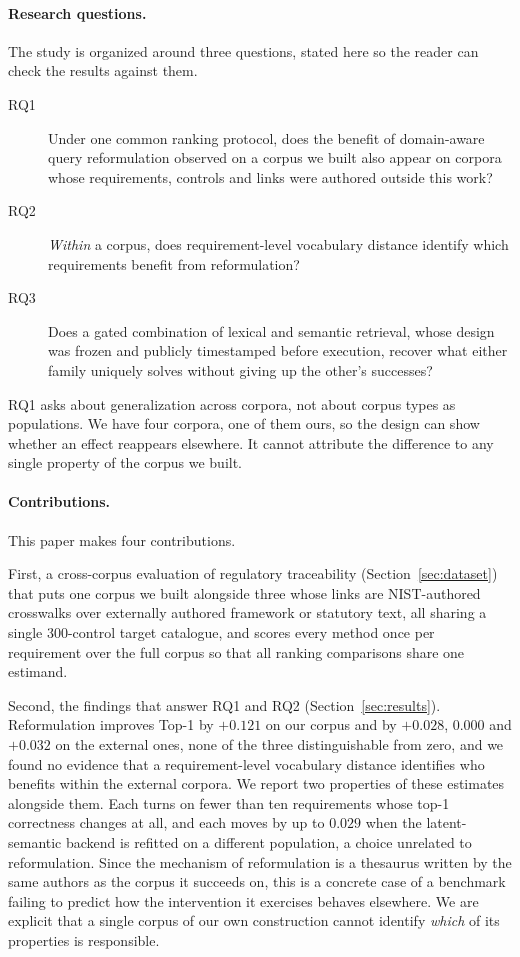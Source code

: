\documentclass[a4paper,fleqn]{cas-sc}
\begin{document}
\paragraph{Research questions.}
The study is organized around three questions, stated here so the reader can check the results against them.

\begin{description}
\item[RQ1] Under one common ranking protocol, does the benefit of domain-aware query reformulation observed on a corpus we built also appear on corpora whose requirements, controls and links were authored outside this work?
\item[RQ2] \emph{Within} a corpus, does requirement-level vocabulary distance identify which requirements benefit from reformulation?
\item[RQ3] Does a gated combination of lexical and semantic retrieval, whose design was frozen and publicly timestamped before execution, recover what either family uniquely solves without giving up the other's successes?
\end{description}

RQ1 asks about generalization across corpora, not about corpus types as populations. We have four corpora, one of them ours, so the design can show whether an effect reappears elsewhere. It cannot attribute the difference to any single property of the corpus we built.

\paragraph{Contributions.}
This paper makes four contributions.

First, a cross-corpus evaluation of regulatory traceability (Section~\ref{sec:dataset}) that puts one corpus we built alongside three whose links are NIST-authored crosswalks over externally authored framework or statutory text, all sharing a single 300-control target catalogue, and scores every method once per requirement over the full corpus so that all ranking comparisons share one estimand.

Second, the findings that answer RQ1 and RQ2 (Section~\ref{sec:results}). Reformulation improves Top-1 by $+0.121$ on our corpus and by $+0.028$, $0.000$ and $+0.032$ on the external ones, none of the three distinguishable from zero, and we found no evidence that a requirement-level vocabulary distance identifies who benefits within the external corpora. We report two properties of these estimates alongside them. Each turns on fewer than ten requirements whose top-1 correctness changes at all, and each moves by up to $0.029$ when the latent-semantic backend is refitted on a different population, a choice unrelated to reformulation. Since the mechanism of reformulation is a thesaurus written by the same authors as the corpus it succeeds on, this is a concrete case of a benchmark failing to predict how the intervention it exercises behaves elsewhere. We are explicit that a single corpus of our own construction cannot identify \emph{which} of its properties is responsible.
\end{document}
